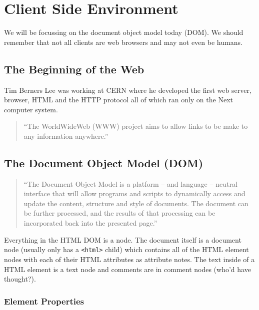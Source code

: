 \section{Client Side Environment}\label{sec:client_side_environment}

We will be focussing on the document object model today (DOM).
We should remember that not all clients are web browsers and may not even be humans.

\subsection{The Beginning of the Web}\label{sub:the_beginning_of_the_web}

Tim Berners Lee was working at CERN where he developed the first web server, browser, HTML and the HTTP protocol all of which ran only on the Next computer system.

\begin{quote}
    ``The WorldWideWeb (WWW) project aims to allow links to be make to any information anywhere.''
\end{quote}

\subsection{The Document Object Model (DOM)}\label{sub:the_document_object_model_dom_}

\begin{quote}
    ``The Document Object Model is a platform -- and language -- neutral interface that will allow programs and scripts to dynamically access and update the content, structure and style of documents.
    The document can be further processed, and the results of that processing can be incorporated back into the presented page.''
\end{quote}
Everything in the HTML DOM is a node.
The document itself is a document node (usually only has a \texttt{<html>} child) which contains all of the HTML element nodes with each of their HTML attributes as attribute notes.
The text inside of a HTML element is a text node and comments are in comment nodes (who'd have thought?).

\subsubsection{Element Properties}\label{ssub:element_properties}

